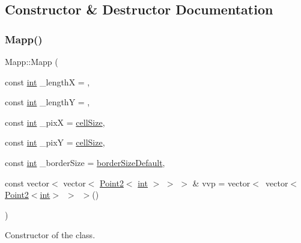 \subsection{Constructor \& Destructor Documentation}
\mbox{\label{class_mapp_a748ffcb20519591210f19458c90f482a}} 
\subsubsection{\texorpdfstring{Mapp()}{Mapp()}}
{\footnotesize\ttfamily Mapp\+::\+Mapp (\begin{DoxyParamCaption}\item[{const \mbox{\hyperlink{draw_8hh_aa620a13339ac3a1177c86edc549fda9b}{int}}}]{\+\_\+lengthX = {},  }\item[{const \mbox{\hyperlink{draw_8hh_aa620a13339ac3a1177c86edc549fda9b}{int}}}]{\+\_\+lengthY = {},  }\item[{const \mbox{\hyperlink{draw_8hh_aa620a13339ac3a1177c86edc549fda9b}{int}}}]{\+\_\+pixX = {\ttfamily \mbox{\hyperlink{class_mapp_a8216044ff8e95ba054985e26ae1c75f8}{cell\+Size}}},  }\item[{const \mbox{\hyperlink{draw_8hh_aa620a13339ac3a1177c86edc549fda9b}{int}}}]{\+\_\+pixY = {\ttfamily \mbox{\hyperlink{class_mapp_a8216044ff8e95ba054985e26ae1c75f8}{cell\+Size}}},  }\item[{const \mbox{\hyperlink{draw_8hh_aa620a13339ac3a1177c86edc549fda9b}{int}}}]{\+\_\+border\+Size = {\ttfamily \mbox{\hyperlink{class_mapp_aef8bde83114714a4ce4ad9d13766e761}{border\+Size\+Default}}},  }\item[{const vector$<$ vector$<$ \mbox{\hyperlink{class_point2}{Point2}}$<$ \mbox{\hyperlink{draw_8hh_aa620a13339ac3a1177c86edc549fda9b}{int}} $>$ $>$ $>$ \&}]{vvp = {\ttfamily vector$<$~vector$<$\mbox{\hyperlink{class_point2}{Point2}}$<$\mbox{\hyperlink{draw_8hh_aa620a13339ac3a1177c86edc549fda9b}{int}}$>$~$>$~$>$()} }\end{DoxyParamCaption})}



Constructor of the class. 


